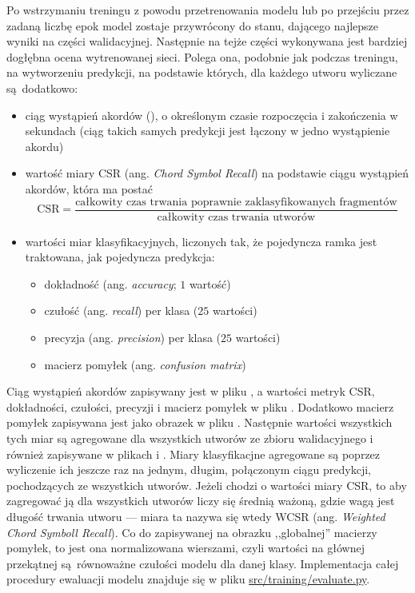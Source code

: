 Po wstrzymaniu treningu z powodu przetrenowania modelu lub po przejściu przez zadaną liczbę epok model zostaje przywrócony do stanu, dającego najlepsze wyniki na części walidacyjnej. Następnie na tejże części wykonywana jest bardziej dogłębna ocena wytrenowanej sieci. Polega ona, podobnie jak podczas treningu, na wytworzeniu predykcji, na podstawie których, dla każdego utworu wyliczane są dodatkowo: 
\begin{itemize}
    \item ciąg wystąpień akordów (), o określonym czasie rozpoczęcia i
        zakończenia w sekundach (ciąg takich samych predykcji jest łączony w jedno wystąpienie
        akordu)
    \item wartość miary CSR (ang. \emph{Chord Symbol Recall}) na podstawie
        ciągu wystąpień akordów, która ma postać
        \begin{displaymath}
            \textrm{CSR} = \frac
                        {\textrm{całkowity czas trwania poprawnie zaklasyfikowanych fragmentów}}
                        {\textrm{całkowity czas trwania utworów}}
        \end{displaymath}
    \item wartości miar klasyfikacyjnych, liczonych tak, że pojedyncza ramka jest traktowana, jak
        pojedyncza predykcja:
        \begin{itemize}
            \item dokładność (ang. \emph{accuracy}; $1$ wartość)
            \item czułość (ang. \emph{recall}) per klasa ($25$ wartości)
            \item precyzja (ang. \emph{precision}) per klasa ($25$ wartości)
            \item macierz pomyłek (ang. \emph{confusion matrix})
        \end{itemize}
\end{itemize}
Ciąg wystąpień akordów zapisywany jest w pliku , a wartości metryk CSR, dokładności, czułości, precyzji i macierz pomyłek w pliku . Dodatkowo macierz pomyłek zapisywana jest jako obrazek w pliku . Następnie wartości wszystkich tych miar są agregowane dla wszystkich utworów ze zbioru walidacyjnego i również zapisywane w plikach  i . Miary klasyfikacjne agregowane są poprzez wyliczenie ich jeszcze raz na jednym, długim, połączonym ciągu predykcji, pochodzących ze wszystkich utworów. Jeżeli chodzi o wartości miary CSR, to aby zagregować ją dla wszystkich utworów liczy się średnią ważoną, gdzie wagą jest długość trwania utworu --- miara ta nazywa się wtedy WCSR (ang. \emph{Weighted Chord Symboll Recall}). Co do zapisywanej na obrazku ,,globalnej'' macierzy pomyłek, to jest ona normalizowana wierszami, czyli wartości na głównej przekątnej są równoważne czułości modelu dla danej klasy. Implementacja całej procedury ewaluacji modelu znajduje się w pliku \url{src/training/evaluate.py}.

